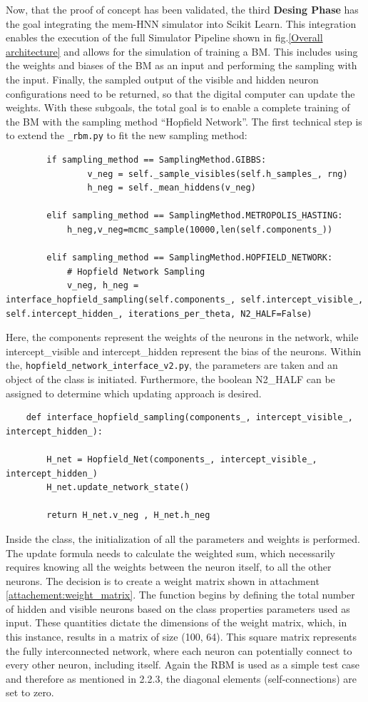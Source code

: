 Now, that the proof of concept has been validated, the third \textbf{Desing Phase} has the goal
integrating the \ac{mem-HNN} simulator into Scikit Learn. 
This integration enables the execution of the full Simulator Pipeline shown in fig.\ref{Overall architecture} and allows for the simulation of training a \ac{BM}.
This includes using the weights and biases of the \ac{BM} as an input and performing the sampling with the input.
Finally, the sampled output of the visible and hidden neuron configurations need to be returned, so that the digital computer can update the weights.
With these subgoals, the total goal is to enable a complete training of the \ac{BM} with the sampling method ``Hopfield Network''. 
The first technical step is to extend the \texttt{\_rbm.py} to fit the new sampling method: 
\begin{lstlisting}
        if sampling_method == SamplingMethod.GIBBS:
                v_neg = self._sample_visibles(self.h_samples_, rng)
                h_neg = self._mean_hiddens(v_neg)

        elif sampling_method == SamplingMethod.METROPOLIS_HASTING:
            h_neg,v_neg=mcmc_sample(10000,len(self.components_))

        elif sampling_method == SamplingMethod.HOPFIELD_NETWORK:  
            # Hopfield Network Sampling
            v_neg, h_neg = interface_hopfield_sampling(self.components_, self.intercept_visible_, self.intercept_hidden_, iterations_per_theta, N2_HALF=False)    
\end{lstlisting}
Here, the components represent the weights of the neurons in the network, while intercept\_visible and intercept\_hidden represent the bias of the neurons. 
Within the, \texttt{hopfield\_network\_interface\_v2.py}, the parameters are taken and an object of the class is initiated. 
Furthermore, the boolean N2\_HALF can be assigned to determine which updating approach is desired. 
\begin{lstlisting}
    def interface_hopfield_sampling(components_, intercept_visible_, intercept_hidden_):
   
        H_net = Hopfield_Net(components_, intercept_visible_, intercept_hidden_)
        H_net.update_network_state()
        
        return H_net.v_neg , H_net.h_neg
\end{lstlisting}
Inside the class, the initialization of all the parameters and weights is performed. 
The update formula needs to calculate the weighted sum, which necessarily requires knowing all the weights between the neuron itself, to all the other neurons. 
The decision is to create a weight matrix shown in attachment \ref{attachement:weight_matrix}. 
The function begins by defining the total number of hidden and visible neurons based on the class properties parameters used as input.
These quantities dictate the dimensions of the weight matrix, which, in this instance, results in a matrix of size (100, 64).
This square matrix represents the fully interconnected network, where each neuron can potentially connect to every other neuron, including itself.
Again the \ac{RBM} is used as a simple test case and therefore as mentioned in 2.2.3, the diagonal elements (self-connections) are set to zero.

